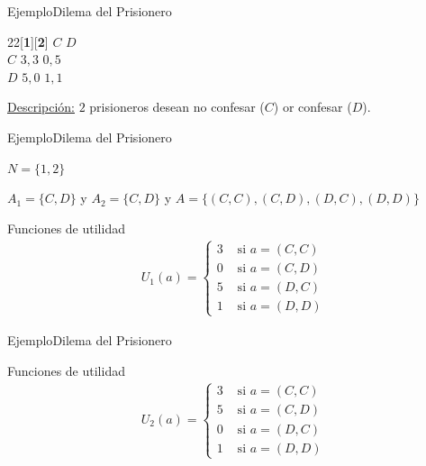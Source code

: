 \documentclass[notes, 11pt]{beamer} %
\newenvironment{wideitemize}{\itemize\addtolength{\itemsep}{10pt}}{\enditemize}
\begin{document}
\begin{frame}{Ejemplo}{Dilema del Prisionero}
\begin{center}
	 \begin{game}{2}{2}[\textbf{1}][\textbf{2}]
                  \>$C$         \>$D$\\
        $C$       \>$3,3$       \>$0,5$\\
        $D$       \>$5,0$       \>$1,1$
 \end{game}
\end{center}
\underline{Descripci\'on:} $2$ prisioneros desean no confesar ($C$) or confesar ($D$).
\end{frame}

\begin{frame}{Ejemplo}{Dilema del Prisionero}
\begin{wideitemize}
	\item<1-> $N=\{1,2\}$
	\item<2-> $A_{1} = \{C,D\}$ y $A_{2} = \{C,D\}$ y $A = \{ (C,C), (C,D), (D,C), (D,D) \}$
	\item<3-> Funciones de utilidad
	\begin{align*}
		U_{1}(a) = \begin{cases}
		 3 &\text{ si } a= (C,C) \\
		 0 &\text{ si } a= (C,D) \\
		 5 &\text{ si } a= (D,C) \\
		 1 &\text{ si } a= (D,D)
		\end{cases}
	\end{align*}
\end{wideitemize}
\end{frame}

\begin{frame}{Ejemplo}{Dilema del Prisionero}
\begin{wideitemize}
	\item<1-> Funciones de utilidad
	\begin{align*}
		U_{2}(a) = \begin{cases}
		3 &\text{ si } a= (C,C) \\
		5 &\text{ si } a= (C,D) \\
		0 &\text{ si } a= (D,C) \\
		1 &\text{ si } a= (D,D)
		\end{cases}
	\end{align*}
\end{wideitemize}
\end{frame}
\end{document}
